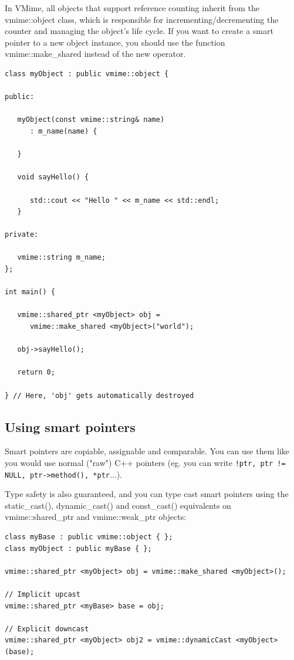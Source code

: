 In VMime, all objects that support reference counting inherit from the
{\vcode vmime::object} class, which is responsible for
incrementing/decrementing the counter and managing the object's life cycle.
If you want to create a smart pointer to a new object instance, you should
use the function {\vcode vmime::make\_shared} instead of the {\vcode new}
operator.

\begin{lstlisting}[caption={Smarts pointers and creating objects}]
class myObject : public vmime::object {

public:

   myObject(const vmime::string& name)
      : m_name(name) {

   }

   void sayHello() {

      std::cout << "Hello " << m_name << std::endl;
   }

private:

   vmime::string m_name;
};

int main() {

   vmime::shared_ptr <myObject> obj =
      vmime::make_shared <myObject>("world");

   obj->sayHello();

   return 0;

} // Here, 'obj' gets automatically destroyed
\end{lstlisting}

\subsection{Using smart pointers} %

Smart pointers are copiable, assignable and comparable. You can use them like
you would use normal ("raw") C++ pointers (eg. you can write
\lstinline{!ptr, ptr != NULL, ptr->method(), *ptr}...).

Type safety is also guaranteed, and you can type cast smart pointers using
the {\vcode static\_cast()}, {\vcode dynamic\_cast()} and {\vcode const\_cast()}
equivalents on {\vcode vmime::shared\_ptr} and {\vcode vmime::weak\_ptr} objects:

\begin{lstlisting}[caption={Casting smart pointers}]
class myBase : public vmime::object { };
class myObject : public myBase { };

vmime::shared_ptr <myObject> obj = vmime::make_shared <myObject>();

// Implicit upcast
vmime::shared_ptr <myBase> base = obj;

// Explicit downcast
vmime::shared_ptr <myObject> obj2 = vmime::dynamicCast <myObject>(base);
\end{lstlisting}

